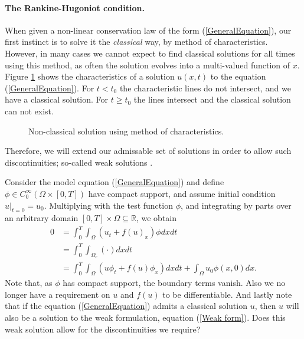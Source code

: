 \documentclass[10pt]{article}
\numberwithin{equation}{section}
\begin{document}
\paragraph{The Rankine-Hugoniot condition.}
When given a non-linear conservation law of the form (\ref{GeneralEquation}), our first instinct is to solve it the \textit{classical} way, by method of characteristics. However, in many cases we cannot expect to find classical solutions for all times using this method, as often the solution evolves into a multi-valued function of $x$. Figure \ref{Fig:Multivalued} shows the characteristics of a solution $u(x,t)$ to the equation (\ref{GeneralEquation}). For $t < t_0$ the characteristic lines do not intersect, and we have a classical solution. For $t \geq t_0$ the lines intersect and the classical solution can not exist. 
\begin{figure}
\begin{center}

\label{Fig:Multivalued}
\caption{Non-classical solution using method of characteristics.}
\end{center}
\end{figure}
Therefore, we will extend our admissable set of solutions in order to allow such discontinuities; so-called weak solutions \cite{HoldenH.Helge2015Ftfh}. 

Consider the model equation (\ref{GeneralEquation}) and define $\phi \in C_0^{\infty}(\Omega \times [0, T])$ have compact support, and assume initial condition $u|_{t=0} = u_0 $. Multiplying with the test function $\phi$, and integrating by parts over an arbitrary domain $[0,T] \times \Omega \subseteq \mathbb{R}$, we obtain
\begin{align}
    0 &= \int_0^T \int_{\Omega} (u_t + f(u)_x)\phi dxdt \nonumber \\
      &= \int_0^T \int_{\Omega_c} (\cdot) dxdt \nonumber \\ 
      &= \int_0^T \int_{\Omega} (u \phi_t + f(u)\phi_x) dxdt + \int_{\Omega} u_0 \phi(x,0) dx. 
    \label{Weak form}
\end{align}
Note that, as $\phi$ has compact support, the boundary terms vanish. Also we no longer have a requirement on $u$ and $f(u)$ to be differentiable. And lastly note that if the equation (\ref{GeneralEquation}) admits a classical solution $u$, then $u$ will also be a solution to the weak formulation, equation (\ref{Weak form}). Does this weak solution allow for the discontinuities we require?
\end{document}

